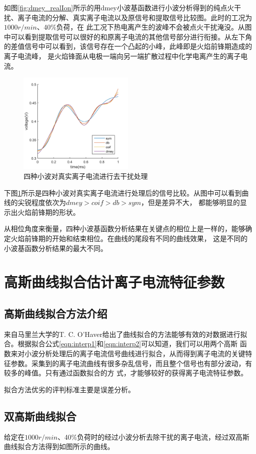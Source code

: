 \par 如图\ref{fig:dmey_realIon}所示的用dmey小波基函数进行小波分析得到的纯点火干扰、离子电流的分解、真实离子电流以及原信号和提取信号比较图。此时的工况为$1000r/min$、40\%负荷，在
此工况下热电离产生的波峰不会被点火干扰淹没。从图中可以看到提取信号可以很好的和原离子电流的其他信号部分进行衔接。从左下角的差值信号中可以看到，该信号存在一个凸起的小峰，此峰即是火焰前锋期造成的离子电流峰，
是火焰锋面从电极一端向另一端扩散过程中化学电离产生的离子电流。
\begin{figure}[!ht]
	\centering
	\includegraphics[width=0.5\textwidth]{thesis_figure/ion_chapter/diff_wv_comp}
	\caption{\label{fig:diff_wv_comp}四种小波对真实离子电流进行去干扰处理}
\end{figure}
\par 下图\ref{fig:diff_wv_comp}所示是四种小波对真实离子电流进行处理后的信号比较。从图中可以看到曲线的尖锐程度依次为$dmey>coif>db>sym$，但是差异不大，
都能够明显的显示出火焰前锋期的形状。\par 从相位角度来衡量，四种小波基函数分析结果在关键点的相位上是一样的，能够确定火焰前锋期的开始和结束相位。在曲线的尾段有不同的曲线效果，
这是不同的小波基函数分析结果的最大不同。
\section{高斯曲线拟合估计离子电流特征参数}
\subsection{高斯曲线拟合方法介绍}
来自马里兰大学的T. C. O'Haver给出了曲线拟合的方法\cite{tco_gs}能够有效的对数据进行拟合。根据拟合公式\ref{eqn:interp1}和\ref{eqn:interp2}可以知道，我们可以用两个高斯
函数来对小波分析处理后的离子电流信号曲线进行拟合，从而得到离子电流的关键特征参数。采集到的离子电流曲线有很多杂乱信号，而且整个信号也有部分波动，有较多的峰值。只有通过函数拟合的方
式，才能够较好的获得离子电流特征参数。
\par 拟合方法优劣的评判标准主要是误差分析。
\subsection{双高斯曲线拟合}
给定在$1000r/min$、40\%负荷时的经过小波分析去除干扰的离子电流，经过双高斯曲线拟合方法得到如图所示的曲线。